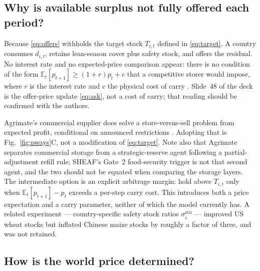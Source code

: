 
\subsection{Why is available surplus not fully offered each period?}

Because \eqref{eq:offers} withholds the target stock \(T_{i,t}\) defined in
\eqref{eq:target}. A country consumes \(d_{i,t}\), retains lean-season
cover plus safety stock, and offers the residual. No interest rate and no
expected-price comparison appear: there is no condition of the form
\(\mathbb{E}_t[p_{t+1}]\ge (1+r)p_t + c\) that a competitive storer would
impose, where \(r\) is the interest rate and \(c\) the physical cost of
carry \citep{wright1982,williams1991,deaton1992}. Slide~48 of the deck is
the offer-price update \eqref{eq:ask}, not a cost of carry; that reading
should be confirmed with the authors.

Agrimate's commercial supplier does solve a store-versus-sell problem from
expected profit, conditional on announced restrictions
\citep{kuhla2025}. Adopting that is Fig.~\ref{fig:pways}C, not a
modification of \eqref{eq:target}. Note also that Agrimate separates
commercial storage from a strategic-reserve agent following a
partial-adjustment refill rule; SHEAF's Gate~2 food-security trigger is not
that second agent, and the two should not be equated when comparing the
storage layers. The intermediate option is an explicit
arbitrage margin: hold above \(T_{i,t}\) only when
\(\mathbb{E}_t[p_{t+1}]-p_t\) exceeds a per-step carry cost. This
introduces both a price expectation and a carry parameter, neither of
which the model currently has. A related experiment --- country-specific
safety stock ratios \(\sigma^{\mathrm{stu}}_i\) --- improved US wheat
stocks but inflated Chinese maize stocks by roughly a factor of three, and
was not retained.


\subsection{How is the world price determined?}

